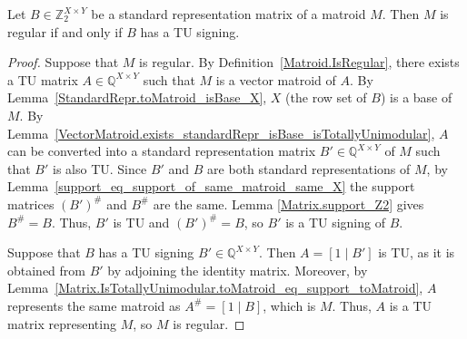 
\begin{lemma}
    \label{StandardRepr.toMatroid_isRegular_iff_hasTuSigning}
    \leanok
    Let $B \in \mathbb{Z}_{2}^{X \times Y}$ be a standard representation matrix of a matroid $M$. Then $M$ is regular if and only if $B$ has a TU signing.
\end{lemma}

\begin{proof}
    \leanok
    Suppose that $M$ is regular. By Definition~\ref{Matroid.IsRegular}, there exists a TU matrix $A \in \mathbb{Q}^{X \times Y}$ such that $M$ is a vector matroid of $A$. By Lemma~\ref{StandardRepr.toMatroid_isBase_X}, $X$ (the row set of $B$) is a base of $M$. By Lemma~\ref{VectorMatroid.exists_standardRepr_isBase_isTotallyUnimodular}, $A$ can be converted into a standard representation matrix $B' \in \mathbb{Q}^{X \times Y}$ of $M$ such that $B'$ is also TU. Since $B'$ and $B$ are both standard representations of $M$, by Lemma~\ref{support_eq_support_of_same_matroid_same_X} the support matrices $(B')^{\#}$ and $B^{\#}$ are the same. Lemma \ref{Matrix.support_Z2} gives $B^{\#} = B$. Thus, $B'$ is TU and $(B')^{\#} = B$, so $B'$ is a TU signing of $B$.

    Suppose that $B$ has a TU signing $B' \in \mathbb{Q}^{X \times Y}$. Then $A = [1 \mid B']$ is TU, as it is obtained from $B'$ by adjoining the identity matrix. Moreover, by Lemma~\ref{Matrix.IsTotallyUnimodular.toMatroid_eq_support_toMatroid}, $A$ represents the same matroid as $A^{\#} = [1 \mid B]$, which is $M$. Thus, $A$ is a TU matrix representing $M$, so $M$ is regular.
\end{proof}
